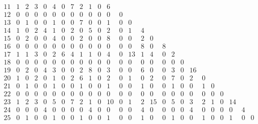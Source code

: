 \begin{landscape}
\[\begin{array}{c|ccccccccccccccccccccccccc}
11&  1&  2&  3&  0&  4&  0&  7&  2&  1&  0&  6&   &   &   &   &   &   &   &   &   &   &   &   &   &   \\
12&  0&  0&  0&  0&  0&  0&  0&  0&  0&  0&  0&  0&   &   &   &   &   &   &   &   &   &   &   &   &   \\
13&  0&  1&  0&  0&  1&  0&  0&  7&  0&  0&  1&  0&  0&   &   &   &   &   &   &   &   &   &   &   &   \\
14&  1&  0&  2&  4&  1&  0&  2&  0&  5&  0&  2&  0&  1&  4&   &   &   &   &   &   &   &   &   &   &   \\
15&  0&  2&  0&  0&  4&  0&  0&  2&  0&  0&  8&  0&  0&  2&  0&   &   &   &   &   &   &   &   &   &   \\
16&  0&  0&  0&  0&  0&  0&  0&  0&  0&  0&  0&  0&  0&  8&  0&  8&   &   &   &   &   &   &   &   &   \\
17&  1&  1&  3&  0&  2&  6&  4&  1&  1&  0&  4&  0& 13&  1&  4&  0&  2&   &   &   &   &   &   &   &   \\
18&  0&  0&  0&  0&  0&  0&  0&  0&  0&  0&  0&  0&  0&  0&  0&  0&  0&  0&   &   &   &   &   &   &   \\
19&  0&  2&  0&  4&  3&  0&  0&  2&  8&  0&  3&  0&  0&  6&  0&  0&  3&  0& 16&   &   &   &   &   &   \\
20&  1&  0&  2&  0&  1&  0&  2&  6&  1&  0&  2&  0&  1&  0&  2&  0&  7&  0&  2&  0&   &   &   &   &   \\
21&  0&  1&  0&  0&  1&  0&  0&  1&  0&  0&  1&  0&  0&  1&  0&  0&  1&  0&  0&  1&  0&   &   &   &   \\
22&  0&  0&  0&  0&  0&  0&  0&  0&  0&  0&  0&  0&  0&  0&  0&  0&  0&  0&  0&  0&  0&  0&   &   &   \\
23&  1&  2&  3&  0&  5&  0&  7&  2&  1&  0& 10&  0&  1&  2& 15&  0&  5&  0&  3&  2&  1&  0& 14&   &   \\
24&  0&  0&  0&  4&  0&  0&  0&  0&  4&  0&  0&  0&  0&  4&  0&  0&  0&  0&  4&  0&  0&  0&  0&  4&   \\
25&  0&  1&  0&  0&  1&  0&  0&  1&  0&  0&  1&  0&  0&  1&  0&  0&  1&  0&  0&  1&  0&  0&  1&  0&  0\\
\end{array}
\]


\end{landscape}
